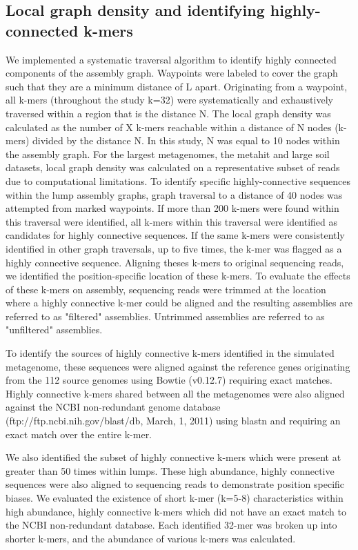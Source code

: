 \documentclass[11pt]{article} %
\begin{document}
\subsection{Local graph density and identifying highly-connected k-mers}
We implemented a systematic traversal algorithm to identify highly connected components of the assembly graph.  Waypoints were labeled to cover the graph such that they are a minimum distance of L apart. Originating from a waypoint, all k-mers (throughout the study k=32) were systematically and exhaustively traversed within a region that is the distance N.  The local graph density was calculated as the number of X k-mers reachable within a distance of N nodes (k-mers) divided by the distance N.  In this study, N was equal to 10 nodes within the assembly graph.  For the largest metagenomes, the metahit and large soil datasets, local graph density was calculated on a representative subset of reads due to computational limitations.  To identify specific highly-connective sequences within the lump assembly graphs, graph traversal to a distance of 40 nodes was attempted from marked waypoints.  If more than 200 k-mers were found within this traversal were identified, all k-mers within this traversal were identified as candidates for highly connective sequences.  If the same k-mers were consistently identified in other graph traversals, up to five times, the k-mer was flagged as a highly connective sequence.  Aligning theses k-mers to original sequencing reads, we identified the position-specific location of these k-mers.  To evaluate the effects of these k-mers on assembly, sequencing reads were trimmed at the location where a highly connective k-mer could be aligned and the resulting assemblies are referred to as "filtered" assemblies.  Untrimmed assemblies are referred to as "unfiltered" assemblies.

To identify the sources of highly connective k-mers identified in the simulated metagenome, these sequences were aligned against the reference genes originating from the 112 source genomes using Bowtie (v0.12.7) requiring exact matches.   Highly connective k-mers shared between all the metagenomes were also aligned against the NCBI non-redundant genome database (ftp://ftp.ncbi.nih.gov/blast/db, March, 1, 2011) using blastn \cite{Altschul:1990p1335} and requiring an exact match over the entire k-mer. 

We also identified the subset of highly connective k-mers which were present at greater than 50 times within lumps.  These high abundance, highly connective sequences were also aligned to sequencing reads to demonstrate position specific biases.  We evaluated the existence of short k-mer (k=5-8) characteristics within high abundance, highly connective k-mers which did not have an exact match to the NCBI non-redundant database.  Each identified 32-mer was broken up into shorter k-mers, and the abundance of various k-mers was calculated.
  
\end{document}
